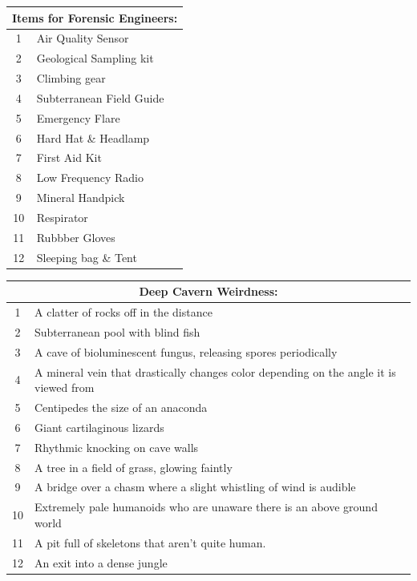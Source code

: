 \documentclass[a4,landscape]{book}
\begin{document}
\begin{multicols*}{4}
\begin{center}
  \begin{tabular}{|c|l|}
    \hline \multicolumn{2}{|c|}{Items for Forensic Engineers:} \\
    \hline 1 & Air Quality Sensor \\
    2 & Geological Sampling kit \\
    3 & Climbing gear \\
    4 & Subterranean Field Guide \\
    5 & Emergency Flare \\
    6 & Hard Hat \& Headlamp \\
    7 & First Aid Kit \\
    8 & Low Frequency Radio \\
    9 & Mineral Handpick \\
    10 & Respirator \\
    11 & Rubbber Gloves \\
    12 & Sleeping bag \& Tent \\ \hline
  \end{tabular}
\end{center}
\vfill
\columnbreak
\begin{center}
  \begin{tabular}{|c|p{}|}
    \hline \multicolumn{2}{|c|}{Deep Cavern Weirdness:} \\
    \hline 1 & A clatter of rocks off in the distance                                            \\
    2 & Subterranean pool with blind fish                                                        \\
    3 & A cave of bioluminescent fungus, releasing spores periodically                           \\
    4 & A mineral vein that drastically changes color depending on the angle it is viewed from   \\
    5 & Centipedes the size of an anaconda                                                       \\
    6 & Giant cartilaginous lizards                                                              \\
    7 & Rhythmic knocking on cave walls                                                          \\
    8 & A tree in a field of grass, glowing faintly                                              \\
    9 & A bridge over a chasm where a slight whistling of wind is audible                        \\
    10 & Extremely pale humanoids who are unaware there is an above ground world                  \\
    11 & A pit full of skeletons that aren't quite human.                                        \\
    12 & An exit into a dense jungle                                                             \\ \hline
  \end{tabular}
\end{center}


\end{multicols*}
\end{document}
